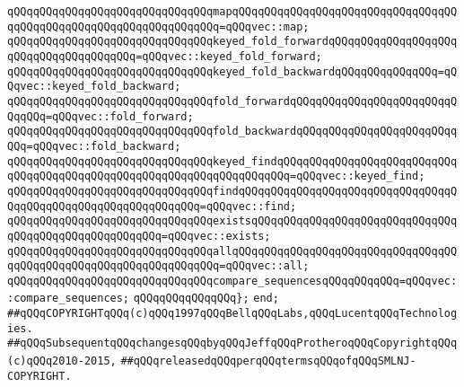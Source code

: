 \verb|qQQqqQQqqQQqqQQqqQQqqQQqqQQqqQQqmapqQQqqQQqqQQqqQQqqQQqqQQqqQQqqQQqqQQqqQQqqQQqqQQqqQQqqQQqqQQqqQQqqQQq=qQQqvec::map;|\newline
\newline
\verb|qQQqqQQqqQQqqQQqqQQqqQQqqQQqqQQqkeyed_fold_forwardqQQqqQQqqQQqqQQqqQQqqQQqqQQqqQQqqQQqqQQq=qQQqvec::keyed_fold_forward;|\newline
\verb|qQQqqQQqqQQqqQQqqQQqqQQqqQQqqQQqkeyed_fold_backwardqQQqqQQqqQQqqQQq=qQQqvec::keyed_fold_backward;|\newline
\newline
\verb|qQQqqQQqqQQqqQQqqQQqqQQqqQQqqQQqfold_forwardqQQqqQQqqQQqqQQqqQQqqQQqqQQqqQQq=qQQqvec::fold_forward;|\newline
\verb|qQQqqQQqqQQqqQQqqQQqqQQqqQQqqQQqfold_backwardqQQqqQQqqQQqqQQqqQQqqQQqqQQq=qQQqvec::fold_backward;|\newline
\newline
\verb|qQQqqQQqqQQqqQQqqQQqqQQqqQQqqQQqkeyed_findqQQqqQQqqQQqqQQqqQQqqQQqqQQqqQQqqQQqqQQqqQQqqQQqqQQqqQQqqQQqqQQqqQQqqQQq=qQQqvec::keyed_find;|\newline
\verb|qQQqqQQqqQQqqQQqqQQqqQQqqQQqqQQqfindqQQqqQQqqQQqqQQqqQQqqQQqqQQqqQQqqQQqqQQqqQQqqQQqqQQqqQQqqQQqqQQq=qQQqvec::find;|\newline
\newline
\verb|qQQqqQQqqQQqqQQqqQQqqQQqqQQqqQQqexistsqQQqqQQqqQQqqQQqqQQqqQQqqQQqqQQqqQQqqQQqqQQqqQQqqQQqqQQq=qQQqvec::exists;|\newline
\verb|qQQqqQQqqQQqqQQqqQQqqQQqqQQqqQQqallqQQqqQQqqQQqqQQqqQQqqQQqqQQqqQQqqQQqqQQqqQQqqQQqqQQqqQQqqQQqqQQqqQQq=qQQqvec::all;|\newline
\newline
\verb|qQQqqQQqqQQqqQQqqQQqqQQqqQQqqQQqcompare_sequencesqQQqqQQqqQQq=qQQqvec::compare_sequences;|\newline
\verb|qQQqqQQqqQQqqQQq};|\newline
\verb|end;|\newline
\newline
\verb|##qQQqCOPYRIGHTqQQq(c)qQQq1997qQQqBellqQQqLabs,qQQqLucentqQQqTechnologies.|\newline
\verb|##qQQqSubsequentqQQqchangesqQQqbyqQQqJeffqQQqProtheroqQQqCopyrightqQQq(c)qQQq2010-2015,|\newline
\verb|##qQQqreleasedqQQqperqQQqtermsqQQqofqQQqSMLNJ-COPYRIGHT.|\newline

